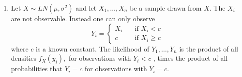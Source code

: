 \documentclass{article}
\begin{document}
\begin{enumerate}
%
%
%


\item Let $X\sim LN(\mu ,\sigma ^{2})$ and let $X_{1},\ldots ,X_{n}$ be a sample
drawn from $X$. The $X_{i}$ are not observable. Instead one can only observe%
\begin{equation*}
Y_{i}=\left\{
\begin{array}{ll}
X_{i} & \quad \text{if }X_{i}<c \\
c & \quad \text{if }X_{i}\geq c%
\end{array}%
\right.
\end{equation*}%
where $c$ is a known constant. The likelihood of $Y_{1},\ldots ,Y_{n}$ is
the product of all densities $f_{X}(y_{i}),$ for observations with $Y_{i}<c$%
, times the product of all probabilities that $Y_{i}=c$ for observations
with $Y_{i}=c$.


\end{enumerate}
\end{document}
